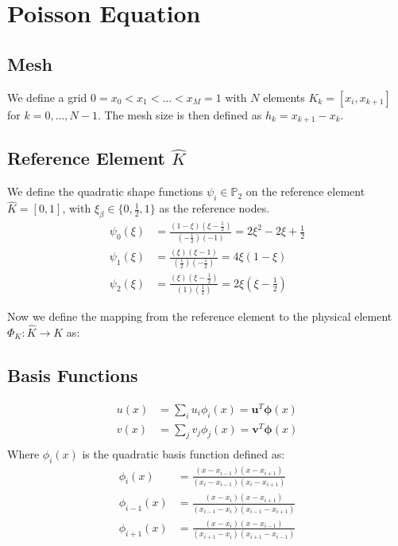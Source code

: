 \documentclass[a4paper,10pt]{article}
\begin{document}

\clearpage

\section{Poisson Equation}
\subsection{Mesh}
We define a grid $0 = x_0 < x_1 < \ldots < x_M = 1$ with $N$ elements $K_k = [x_i, x_{k+1}]$ for $k = 0, \ldots, N-1$.
The mesh size is then defined as $h_k = x_{k+1} - x_k$.
\subsection{Reference Element $\hat{K}$}
We define the quadratic shape functions $\psi_i \in \mathbb{P}_2$ on the reference element $\hat{K} = [0, 1]$, with $\xi_\beta \in \{0, \frac{1}{2}, 1\}$ as the reference nodes.
\begin{align*}
    \psi_0(\xi) &= \frac{(1-\xi)(\xi-\frac{1}{2})}{(-\frac{1}{2})(-1)} = 2\xi^2 - 2\xi + \frac{1}{2}\\
    \psi_1(\xi) &= \frac{(\xi)(\xi-1)}{(\frac{1}{2})(-\frac{1}{2})} = 4\xi(1-\xi)\\
    \psi_2(\xi) &= \frac{(\xi)(\xi-\frac{1}{2})}{(1)(\frac{1}{2})} = 2\xi(\xi-\frac{1}{2})
\end{align*}

Now we define the mapping from the reference element to the physical element $\Phi_K: \hat{K} \to K$ as:



\subsection{Basis Functions}
\begin{align*}
    u(x) &= \sum_i u_i \phi_i(x) = \mathbf{u}^T \symbf{\phi}(x)\\
    v(x) &= \sum_j v_j \phi_j(x) = \mathbf{v}^T \symbf{\phi}(x)\\
\end{align*}
Where $\phi_i(x)$ is the quadratic basis function defined as:
\begin{align*}
    \phi_i(x) &= \frac{(x-x_{i-1})(x-x_{i+1})}{(x_i-x_{i-1})(x_i-x_{i+1})}\\
    \phi_{i-1}(x) &= \frac{(x-x_i)(x-x_{i+1})}{(x_{i-1}-x_i)(x_{i-1}-x_{i+1})}\\
    \phi_{i+1}(x) &= \frac{(x-x_i)(x-x_{i-1})}{(x_{i+1}-x_i)(x_{i+1}-x_{i-1})}
\end{align*}
\end{document}
